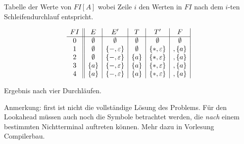 Tabelle der Werte von $FI[A]$ wobei Zeile $i$ den Werten in $FI$ nach
dem $i$-ten Schleifendurchlauf entspricht.

\begin{displaymath}
  \begin{array}{c||c|c|c|c|c|}
    FI & E & E' & T & T' & F \\\hline
    0  & \emptyset & \emptyset & \emptyset & \emptyset & \emptyset \\
    1  & \emptyset & \{ -, \varepsilon \} & \emptyset & \{ *, \varepsilon \} & , \{a\} \\
    2  & \emptyset & \{ -, \varepsilon \} & \{a\} & \{ *, \varepsilon \} & , \{a\} \\
    3  & \{a\} & \{ -, \varepsilon \} & \{a\} & \{ *, \varepsilon \} & , \{a\} \\
    4  & \{a\} & \{ -, \varepsilon \} & \{a\} & \{ *, \varepsilon \} & , \{a\} \\
  \end{array}
\end{displaymath}

Ergebnis nach vier Durchläufen. 

Anmerkung: first ist nicht die vollständige Lösung des Problems. Für
den Lookahead müssen auch noch die Symbole betrachtet werden, die
\emph{nach} einem bestimmten Nichtterminal auftreten können. Mehr dazu
in Vorlesung Compilerbau. 

